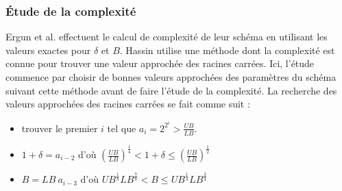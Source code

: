 \documentclass[10pt,francais]{llncs}
\begin{document}
{\subsubsection{\'Etude de la complexit\'e}
Ergun et al. \cite{Ergun2002} effectuent le calcul de complexit\'e de leur sch\'ema en utilisant les valeurs exactes pour $\delta$ et $B$. Hassin \cite{Hassin1992} utilise une m\'ethode dont la complexit\'e est connue pour trouver une valeur approch\'ee des racines carr\'ees. Ici, l'\'etude commence par choisir de bonnes valeurs approch\'ees des param\`etres du sch\'ema suivant cette m\'ethode avant de faire l'\'etude de la complexit\'e. La recherche des valeurs approch\'ees des racines carr\'ees se fait comme suit :
\begin{itemize}
\itemsep = 0.5ex
\item trouver le premier $i$ tel que $\displaystyle a_i = 2^{2^i} > \frac{UB}{LB}$.
\item $\displaystyle 1 + \delta = a_{i-2}$ d'o\`u $\displaystyle\left(\frac{UB}{LB}\right)^\frac{1}{4}<1+\delta\leq\left(\frac{UB}{LB} \right)^\frac{1}{2}$
\item $\displaystyle B = LB\ a_{i-3}$ d'o\`u $\displaystyle {UB}^\frac{1}{8}{LB}^\frac{7}{8}<B\leq{UB}^\frac{1}{4}{LB}^\frac{3}{4}$
\end{itemize}

}
\end{document}
